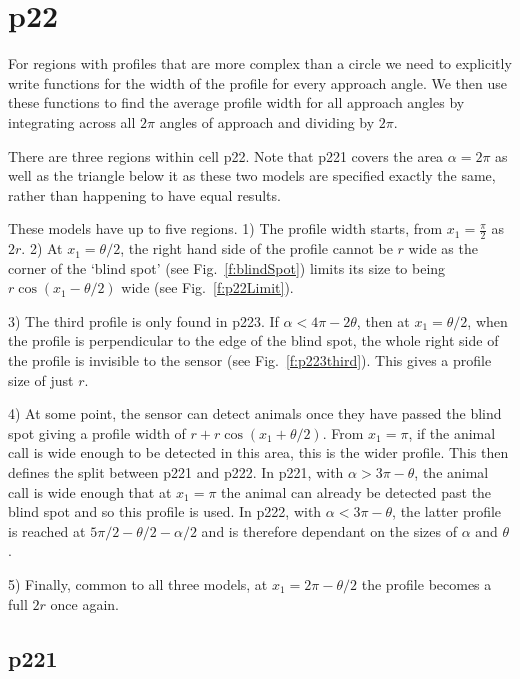 

\section{p22} \label{p22}

For regions with profiles that are more complex than a circle we need to explicitly write functions for the width of the profile for every approach angle. We then use these functions to find the average profile width for all approach angles by integrating across all $2\pi$ angles of approach and dividing by $2\pi$. 



There are three regions within cell p22. Note that p221 covers the area $\alpha=2\pi$ as well as the triangle below it as these two models are specified exactly the same, rather than happening to have equal results.

These models have up to five regions. 1) The profile width starts, from $x_1=\frac{\pi}{2}$ as $2r$. 2) At $x_1 = \theta/2$, the right hand side of the profile cannot be $r$ wide as the corner of the `blind spot' (see Fig.~\ref{f:blindSpot}) limits its size to being $r\cos(x_1 - \theta/2)$ wide (see Fig.~\ref{f:p22Limit}). 

3) The third profile is only found in p223. If $\alpha < 4\pi - 2\theta$, then at $x_1=\theta/2$, when the profile is perpendicular to the edge of the blind spot, the whole right side of the profile is invisible to the sensor (see Fig.~\ref{f:p223third}). This gives a profile size of just $r$.

4) At some point, the sensor can detect animals once they have passed the blind spot giving a profile width of $r + r\cos(x_1 + \theta/2)$. From $x_1=\pi$, if the animal call is wide enough to be detected in this area, this is the wider profile. This then defines the split between p221 and p222. In p221, with $\alpha > 3\pi - \theta$, the animal call is wide enough that at $x_1=\pi$ the animal can already be detected past the blind spot and so this profile is used. In p222, with $\alpha < 3\pi - \theta$, the latter profile is reached at $5\pi/2 - \theta/2 - \alpha/2$ and is therefore dependant on the sizes of $\alpha$ and $\theta$. 

5) Finally, common to all three models, at $x_1 = 2\pi - \theta/2$ the profile becomes a full $2r$ once again.


\subsection{p221} \label{p221}

